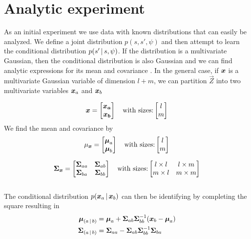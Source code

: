 \section{Analytic experiment}
\label{exp:analytic}
As an initial experiment we use data with known distributions that can easily be analyzed. We define a joint distribution $p(s,s',\psi)$ and then attempt to learn the conditional distribution $p\given{s'}{s,\psi}$. If the distribution is a multivariate Gaussian, then the conditional distribution is also Gaussian and we can find analytic expressions for its mean and covariance \parencite{bishop:2006:PRML}. In the general case, if $\boldsymbol{x}$ is a multivariate Gaussian variable of dimension $l+m$, we can partition $\vec{Z}$ into two multivariate variables $\boldsymbol{x}_a$ and $\boldsymbol{x}_b$

\begin{equation}
\boldsymbol{\boldsymbol{x}} = 
\begin{bmatrix}
\boldsymbol{\boldsymbol{x}_a} \\
\boldsymbol{\boldsymbol{x}_b}
\end{bmatrix}
\quad
\text{with sizes:} 
\begin{bmatrix}
l \\
m
\end{bmatrix}
\end{equation}
We find the mean and covariance by
\begin{equation}
\mu_{\boldsymbol{x}} = 
\begin{bmatrix}
\boldsymbol{\mu}_{a} \\
\boldsymbol{\mu}_{b}
\end{bmatrix}
\quad
\text{with sizes:} 
\begin{bmatrix}
l \\
m
\end{bmatrix}
\end{equation}

\begin{equation}
\boldsymbol{\Sigma}_{\boldsymbol{x}} = 
\begin{bmatrix}
\boldsymbol{\Sigma}_{aa} & \boldsymbol{\Sigma}_{ab} \\
\boldsymbol{\Sigma}_{ba} & \boldsymbol{\Sigma}_{bb}
\end{bmatrix}
\quad
\text{with sizes:} 
\begin{bmatrix}
l\times l & l \times m\\
m \times l & m \times m
\end{bmatrix}
\end{equation}
\\
The conditional distribution $p\given{\vx_a}{\vx_b}$ can then be identifying by completing the square resulting in
\begin{align}
\vec{\mu}_{\given{a}{b}} &= \vec{\mu}_{a} + \vec{\Sigma}_{ab}\vec{\Sigma}_{bb}^{-1}(\vec{x}_b - \vec{\mu}_{a})
\label{eq_cond_mean}
\\
\vec{\Sigma}_{\given{a}{b}} &= \vec{\Sigma}_{aa} - \vec{\Sigma}_{ab}\vec{\Sigma}_{bb}^{-1}\vec{\Sigma}_{ba}
\label{eq_cond_var}
\end{align}


